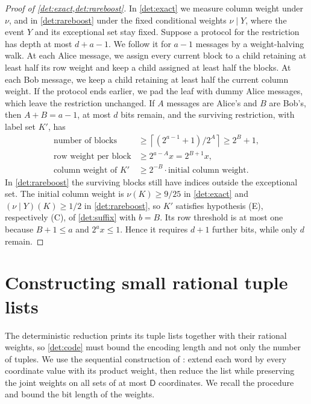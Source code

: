 \documentclass[11pt,letterpaper]{article} \usepackage[utf8]{inputenc}
\theoremstyle{plain} \newtheorem{theorem}{Theorem}[section]
\theoremstyle{definition} \newaliascnt{definition}{theorem}
\newcommand{\ceil}[1]{\left\lceil#1\right\rceil}
\begin{document}
\begin{proof}[Proof of \cref{det:exact,det:rareboost}]
\label{proof:det:exact}\label{proof:det:rareboost}
In \cref{det:exact} we measure column weight under $\nu$, and in
\cref{det:rareboost} under the fixed conditional weights $\nu\mid Y$, where
the event $Y$ and its exceptional set stay fixed. Suppose a protocol for the
restriction has depth at most $d+a-1$. We follow it for $a-1$ messages by a
weight-halving walk. At each Alice message, we assign every current block to
a child retaining at least half its row weight and keep a child assigned at
least half the blocks. At each Bob message, we keep a child retaining at least
half the current column weight. If the protocol ends earlier, we pad the leaf with dummy Alice messages, which leave the
restriction unchanged. If $A$ messages are Alice's and $B$ are Bob's, then
$A+B=a-1$, at most $d$ bits remain, and the surviving restriction, with label
set $K'$, has
\[
\begin{aligned}
\text{number of blocks}
&\ge\ceil{(2^{a-1}+1)/2^A}\ge2^B+1,\\
\text{row weight per block}&\ge2^{a-A}x=2^{B+1}x,\\
\text{column weight of }K'&\ge2^{-B}\cdot\text{initial column weight}.
\end{aligned}
\]
In \cref{det:rareboost} the surviving blocks still have indices outside the
exceptional set. The initial column weight is $\nu(K)\ge9/25$ in
\cref{det:exact} and $(\nu\mid Y)(K)\ge1/2$ in \cref{det:rareboost}, so $K'$
satisfies hypothesis (E), respectively (C), of \cref{det:suffix} with $b=B$.
Its row threshold is at most one because $B+1\le a$ and $2^ax\le1$. Hence
it requires $d+1$ further bits, while only $d$ remain.
\end{proof}

\section{Constructing small rational tuple lists}
\label{sec:support-algorithm}

The deterministic reduction prints its tuple lists together with their
rational weights, so \cref{det:code} must bound the encoding length and not
only the number of tuples. We use the sequential construction of
\citet[Section~3]{koller1994sample}: extend each word by every coordinate
value with its product weight, then reduce the list while preserving the
joint weights on all sets of at most $\mathsf D$ coordinates. We recall the
procedure and bound the bit length of the weights.
\end{document}
